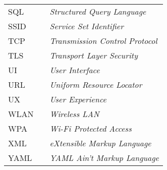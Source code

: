 \begin{table}[H]
\begin{tabular}{lll}
SQL   &  & \textit{Structured Query Language}                        \\
SSID  &  & \textit{Service Set Identifier}                           \\
TCP   &  & \textit{Transmission Control Protocol}                    \\
TLS   &  & \textit{Transport Layer Security}                         \\
UI    &  & \textit{User Interface}                                   \\
URL   &  & \textit{Uniform Resource Locator}                         \\
UX    &  & \textit{User Experience}                                  \\
WLAN  &  & \textit{Wireless LAN}                                     \\
WPA   &  & \textit{Wi-Fi Protected Access}                           \\
XML   &  & \textit{eXtensible Markup Language}                       \\
YAML  &  & \textit{YAML Ain't Markup Language}
\end{tabular}
\end{table}
